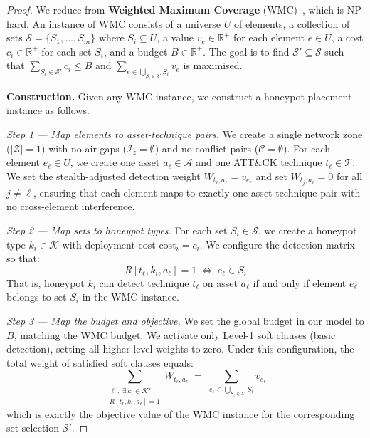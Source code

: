\documentclass[journal]{IEEEtran}
\newcommand{\calK}{\mathcal{K}}
\newcommand{\calT}{\mathcal{T}}
\newcommand{\calA}{\mathcal{A}}
\newcommand{\calZ}{\mathcal{Z}}
\newcommand{\calC}{\mathcal{C}}
\begin{document}
\begin{proofbox}
\begin{proof}
We reduce from \textbf{Weighted Maximum Coverage}
(WMC)~\cite{feige1998}, which is NP-hard.
An instance of WMC consists of a universe $U$ of elements,
a collection of sets $\mathcal{S} = \{S_1, \ldots, S_m\}$
where $S_i \subseteq U$, a value $v_e \in \mathbb{R}^+$ for
each element $e \in U$, a cost $c_i \in \mathbb{R}^+$ for
each set $S_i$, and a budget $B \in \mathbb{R}^+$.
The goal is to find $\mathcal{S}' \subseteq \mathcal{S}$
such that $\sum_{S_i \in \mathcal{S}'} c_i \leq B$ and
$\sum_{e \in \bigcup_{S_i \in \mathcal{S}'} S_i} v_e$ is
maximised.

\medskip
\noindent\textbf{Construction.}
Given any WMC instance, we construct a honeypot placement
instance as follows.

\noindent\emph{Step 1 --- Map elements to asset-technique
pairs.}
We create a single network zone ($|\calZ|=1$) with no air
gaps ($\mathcal{I}_z = \emptyset$) and no conflict pairs
($\calC = \emptyset$).
For each element $e_\ell \in U$, we create one asset
$a_\ell \in \calA$ and one ATT\&CK technique
$t_\ell \in \calT$.
We set the stealth-adjusted detection weight
$W_{t_\ell, a_\ell} = v_{e_\ell}$ and set
$W_{t_j, a_\ell} = 0$ for all $j \neq \ell$, ensuring
that each element maps to exactly one asset-technique pair
with no cross-element interference.

\noindent\emph{Step 2 --- Map sets to honeypot types.}
For each set $S_i \in \mathcal{S}$, we create a honeypot
type $k_i \in \calK$ with deployment cost
$\mathrm{cost}_i = c_i$.
We configure the detection matrix so that:
\begin{equation}
  R[t_\ell, k_i, a_\ell] = 1
  \;\iff\; e_\ell \in S_i
  \label{eq:rmap}
\end{equation}
That is, honeypot $k_i$ can detect technique $t_\ell$ on
asset $a_\ell$ if and only if element $e_\ell$ belongs to
set $S_i$ in the WMC instance.

\noindent\emph{Step 3 --- Map the budget and objective.}
We set the global budget in our model to $B$, matching the
WMC budget.
We activate only Level-1 soft clauses (basic detection),
setting all higher-level weights to zero.
Under this configuration, the total weight of satisfied
soft clauses equals:
\begin{equation}
  \sum_{\substack{\ell\,:\;\exists\, k_i \in \calK' \\
    R[t_\ell,k_i,a_\ell]=1}}
  W_{t_\ell, a_\ell}
  \;=\;
  \sum_{e_\ell \in \bigcup_{S_i \in \mathcal{S}'} S_i}
  v_{e_\ell}
  \label{eq:objmap}
\end{equation}
which is exactly the objective value of the WMC instance
for the corresponding set selection $\mathcal{S}'$.


\end{proof}
\end{proofbox}
\end{document}
